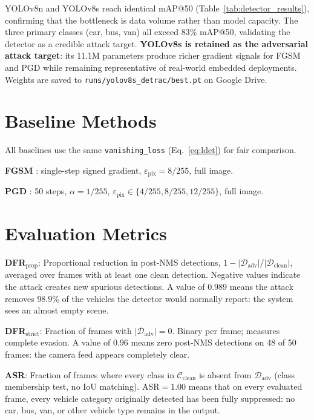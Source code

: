 \documentclass[12pt,a4paper]{report}
\begin{document}
\noindent YOLOv8n and YOLOv8s reach identical mAP@50 (Table~\ref{tab:detector_results}),
confirming that the bottleneck is data volume rather than model capacity. The three
primary classes (car, bus, van) all exceed 83\% mAP@50, validating the detector as
a credible attack target. \textbf{YOLOv8s is retained as the adversarial attack
target}: its 11.1M parameters produce richer gradient signals for FGSM and PGD
while remaining representative of real-world embedded deployments. Weights are
saved to \texttt{runs/yolov8s\_detrac/best.pt} on Google Drive.

\section{Baseline Methods}
\label{sec:baselines}

All baselines use the same \texttt{vanishing\_loss} (Eq.~\ref{eq:ldet}) for fair comparison.

\textbf{FGSM} \cite{goodfellow2014explaining}: single-step signed gradient, $\varepsilon_{\text{pix}} = 8/255$, full image.

\textbf{PGD} \cite{madry2018towards}: 50 steps, $\alpha = 1/255$, $\varepsilon_{\text{pix}} \in \{4/255, 8/255, 12/255\}$, full image.

\section{Evaluation Metrics}
\label{sec:metrics}

\textbf{DFR$_{\text{prop}}$}: Proportional reduction in post-NMS detections,
$1 - |\mathcal{D}_{\text{adv}}|/|\mathcal{D}_{\text{clean}}|$, averaged over frames with
at least one clean detection. Negative values indicate the attack creates new spurious
detections. A value of $0.989$ means the attack removes $98.9\%$ of the vehicles the
detector would normally report: the system sees an almost empty scene.

\textbf{DFR$_{\text{strict}}$}: Fraction of frames with $|\mathcal{D}_{\text{adv}}| = 0$.
Binary per frame; measures complete evasion. A value of $0.96$ means
zero post-NMS detections on 48 of 50 frames: the camera feed appears completely clear.

\textbf{ASR}: Fraction of frames where every class in $\mathcal{C}_{\text{clean}}$ is absent
from $\mathcal{D}_{\text{adv}}$ (class membership test, no IoU matching). ASR$=1.00$ means
that on every evaluated frame, every vehicle category originally detected has been fully
suppressed: no car, bus, van, or other vehicle type remains in the output.
\end{document}
